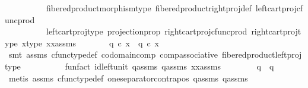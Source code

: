 \begin{isabellebody}
\ \ \ \ \ \ \ \ \ \ fibered{\isacharunderscore}{\kern0pt}product{\isacharunderscore}{\kern0pt}morphism{\isacharunderscore}{\kern0pt}type\ fibered{\isacharunderscore}{\kern0pt}product{\isacharunderscore}{\kern0pt}right{\isacharunderscore}{\kern0pt}proj{\isacharunderscore}{\kern0pt}def\ left{\isacharunderscore}{\kern0pt}cart{\isacharunderscore}{\kern0pt}proj{\isacharunderscore}{\kern0pt}cfunc{\isacharunderscore}{\kern0pt}prod\isanewline
\ \ \ \ \ \ \ \ \ \ left{\isacharunderscore}{\kern0pt}cart{\isacharunderscore}{\kern0pt}proj{\isacharunderscore}{\kern0pt}type\ projection{\isacharunderscore}{\kern0pt}prop\ right{\isacharunderscore}{\kern0pt}cart{\isacharunderscore}{\kern0pt}proj{\isacharunderscore}{\kern0pt}cfunc{\isacharunderscore}{\kern0pt}prod\ right{\isacharunderscore}{\kern0pt}cart{\isacharunderscore}{\kern0pt}proj{\isacharunderscore}{\kern0pt}type\ x{\isacharunderscore}{\kern0pt}type\ xx{\isacharunderscore}{\kern0pt}assms{\isacharparenleft}{\kern0pt}{}{\isacharparenright}{\kern0pt}{\isacharparenright}{\kern0pt}\isanewline
\ \ \ \ \isamarkupfalse%
\ \isamarkupfalse%
\ {\isachardoublequoteopen}q{}\ {\isasymcirc}\isactrlsub c\ x\ {\isacharequal}{\kern0pt}\ q{}\ {\isasymcirc}\isactrlsub c\ x{\isachardoublequoteclose}\isanewline
\ \ \ \ \ \ \isanewline
\ \ \ \ \ \ \isamarkupfalse%
\ {\isacharparenleft}{\kern0pt}smt\ assms{\isacharparenleft}{\kern0pt}{}{\isacharparenright}{\kern0pt}\ cfunc{\isacharunderscore}{\kern0pt}type{\isacharunderscore}{\kern0pt}def\ codomain{\isacharunderscore}{\kern0pt}comp\ comp{\isacharunderscore}{\kern0pt}associative\ fibered{\isacharunderscore}{\kern0pt}product{\isacharunderscore}{\kern0pt}left{\isacharunderscore}{\kern0pt}proj{\isacharunderscore}{\kern0pt}type\isanewline
\ \ \ \ \ \ \ \ \ \ fun{\isacharunderscore}{\kern0pt}fact\ id{\isacharunderscore}{\kern0pt}left{\isacharunderscore}{\kern0pt}unit{}\ q{}{\isacharunderscore}{\kern0pt}assms\ q{}{\isacharunderscore}{\kern0pt}assms\ xx{\isacharunderscore}{\kern0pt}assms{\isacharparenright}{\kern0pt}\isanewline
\ \ \isamarkupfalse%
\isanewline
\ \ \isamarkupfalse%
\ \isamarkupfalse%
\ {\isachardoublequoteopen}q{}\ {\isacharequal}{\kern0pt}\ q{}{\isachardoublequoteclose}\isanewline
\ \ \ \ \isamarkupfalse%
\ {\isacharparenleft}{\kern0pt}metis\ assms{\isacharparenleft}{\kern0pt}{}{\isacharparenright}{\kern0pt}\ cfunc{\isacharunderscore}{\kern0pt}type{\isacharunderscore}{\kern0pt}def\ one{\isacharunderscore}{\kern0pt}separator{\isacharunderscore}{\kern0pt}contrapos\ q{}{\isacharunderscore}{\kern0pt}assms{\isacharparenleft}{\kern0pt}{}{\isacharparenright}{\kern0pt}\ q{}{\isacharunderscore}{\kern0pt}assms{\isacharparenleft}{\kern0pt}{}{\isacharparenright}{\kern0pt}{\isacharparenright}{\kern0pt}\isanewline

\end{isabellebody}
